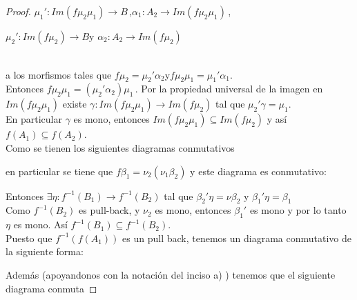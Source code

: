 \documentclass{article}
\begin{document}
\begin{enumerate}[label=\textbf{Ej \arabic*.}]
\begin{proof}
\centerline{
$\mu_1':Im(f\mu_2\mu_1)\to B$\,,\qquad $\alpha_1:A_2\to Im(f\mu_2\mu_1)$\,,}

\centerline{
$\mu_2':Im(f\mu_2)\to B$\quad y \quad $\alpha_2:A_2\to Im(f\mu_2)$
}

\,\\ a los morfismos tales que $f\mu_2=\mu_2'\alpha_2$\quad y\quad $f\mu_2\mu_1=\mu_1'\alpha_1$.\\
Entonces $f\mu_2\mu_1=(\mu_2'\alpha_2)\mu_1\,.$ Por la propiedad universal de la imagen en $Im(f\mu_2\mu_1)$ existe 
$\gamma : Im(f\mu_2\mu_1)\to Im(f\mu_2)$ tal que $\mu_2'\gamma=\mu_1$.\\
 En particular $\gamma$ es mono, entonces $Im(f\mu_2\mu_1)\subseteq Im(f\mu_2)$ y así \\$f(A_1)\subseteq f(A_2)$.\\

 Como se tienen los siguientes diagramas conmutativos\\

\centerline{
}

en particular se tiene que $f\beta_1=\nu_2(\nu_1\beta_2)$ y este diagrama es conmutativo:\\

\centerline{
}

Entonces $\exists \eta : f^{-1}(B_1)\to f^{-1}(B_2)$ tal que $\beta_2'\eta=\nu\beta_2$\,\,y\,\,$\beta_1'\eta=\beta_1$\\

Como $f^{-1}(B_2)$ es pull-back, y $\nu_2$ es mono, entonces $\beta_1'$ es mono y por lo tanto $\eta$ es mono. Así $f^{-1}(B_1)\subseteq f^{-1}(B_2)$.
\\

 Puesto que $f^{-1}(f(A_1))$ es un pull back, tenemos un diagrama conmutativo de la siguiente forma:\\

\centerline{
}

Además (apoyandonos con la notación del inciso a) ) tenemos que el siguiente diagrama conmuta


\end{proof}
\end{enumerate}
\end{document}
